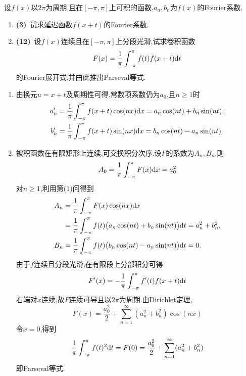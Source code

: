 \documentclass{ctexart}
\begin{document}
\begin{problem}[8.(15\songti{分})]
设$f(x)$以$2\pi$为周期,且在$[-\pi,\pi]$上可积的函数.$a_n,b_n$为$f(x)$的Fourier系数.
        \begin{enumerate}[label=\tbf{(\arabic*)},topsep=0pt,parsep=0pt,itemsep=0pt,partopsep=0pt]
            \item \textbf{(3)}\ 试求延迟函数$f(x+t)$的Fourier系数.
            \item \textbf{(12)}\ 设$f(x)$连续且在$[-\pi,\pi]$上分段光滑,试求卷积函数
                \[F(x)=\dfrac{1}{\pi}\int_{-\pi}^{\pi}f(t)f(x+t)\mathrm{d} t\]
                的Fourier展开式,并由此推出Parseval等式.

        \end{enumerate}
\end{problem}
\begin{solution}
\begin{enumerate}[label=\tbf{(\arabic*)},topsep=0pt,parsep=0pt,itemsep=0pt,partopsep=0pt]
\item 由换元$u=x+t$及周期性可得,常数项系数仍为$a_0$,且$n\geqslant1$时
\[\begin{aligned}
a_n'&=\frac1\pi\int_{-\pi}^\pi f(x+t)\cos(nx)\mathrm{d} x
=a_n\cos(nt)+b_n\sin(nt),\\
b_n'&=\frac1\pi\int_{-\pi}^\pi f(x+t)\sin(nx)\mathrm{d} x
=b_n\cos(nt)-a_n\sin(nt).
\end{aligned}\]
\item 被积函数在有限矩形上连续,可交换积分次序.设$F$的系数为$A_n,B_n$,则
\[A_0=\frac1\pi\int_{-\pi}^\pi F(x)\mathrm{d} x=a_0^2\]
对$n\geqslant1$,利用第(1)问得到
\[\begin{aligned}
A_n&=\frac1\pi\int_{-\pi}^\pi F(x)\cos(nx)\mathrm{d} x\\
&=\frac1\pi\int_{-\pi}^\pi f(t)\bigl(a_n\cos(nt)+b_n\sin(nt)\bigr)\mathrm{d} t
=a_n^2+b_n^2,\\
B_n&=\frac1\pi\int_{-\pi}^\pi f(t)\bigl(b_n\cos(nt)-a_n\sin(nt)\bigr)\mathrm{d} t=0.
\end{aligned}\]
由于$f$连续且分段光滑,在有限段上分部积分可得
\[F'(x)=-\frac1\pi\int_{-\pi}^\pi f'(t)f(x+t)\mathrm{d} t\]
右端对$x$连续,故$F$连续可导且以$2\pi$为周期.由Dirichlet定理,
\[F(x)=\frac{a_0^2}{2}+\sum_{n=1}^{\infty}(a_n^2+b_n^2)\cos(nx)\]
令$x=0$,得到
\[\frac1\pi\int_{-\pi}^\pi f(t)^2\mathrm{d} t
=F(0)=\frac{a_0^2}{2}+\sum_{n=1}^{\infty}(a_n^2+b_n^2)\]
即Parseval等式.
\end{enumerate}
\end{solution}
\end{document}
